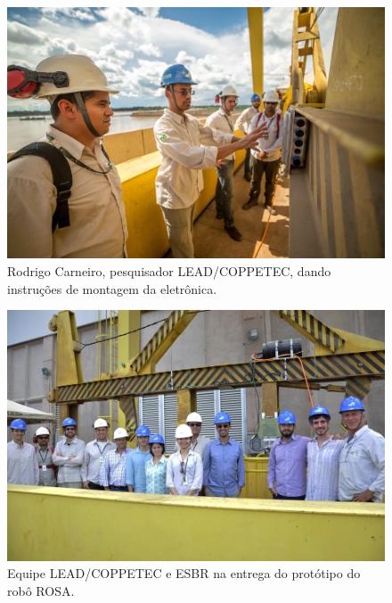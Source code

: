\begin{figure}[h!]
  \centering
  \includegraphics[width=1\linewidth]{Fotos/Fevereiro2015/fev20152.jpg}
  \caption{Rodrigo Carneiro, pesquisador LEAD/COPPETEC, dando instruções de
  montagem da eletrônica.}
  \label{fev20152}
\end{figure}

\begin{figure}[h!]
  \centering
  \includegraphics[width=1\linewidth]{Fotos/Fevereiro2015/fev20153.jpg}
  \caption{Equipe LEAD/COPPETEC e ESBR na entrega do protótipo do robô ROSA.}
  \label{fev20153}
\end{figure}